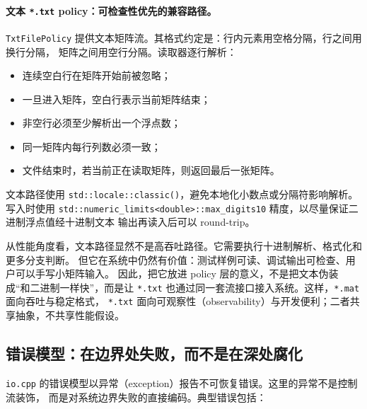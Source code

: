 \paragraph{文本 \texttt{*.txt} policy：可检查性优先的兼容路径。}
\texttt{TxtFilePolicy} 提供文本矩阵流。其格式约定是：行内元素用空格分隔，行之间用换行分隔，
矩阵之间用空行分隔。读取器逐行解析：

\begin{itemize}
    \item 连续空白行在矩阵开始前被忽略；
    \item 一旦进入矩阵，空白行表示当前矩阵结束；
    \item 非空行必须至少解析出一个浮点数；
    \item 同一矩阵内每行列数必须一致；
    \item 文件结束时，若当前正在读取矩阵，则返回最后一张矩阵。
\end{itemize}

文本路径使用 \texttt{std::locale::classic()}，避免本地化小数点或分隔符影响解析。
写入时使用 \texttt{std::numeric\_limits<double>::max\_digits10} 精度，以尽量保证二进制浮点值经十进制文本
输出再读入后可以 round-trip。

从性能角度看，文本路径显然不是高吞吐路径。它需要执行十进制解析、格式化和更多分支判断。
但它在系统中仍然有价值：测试样例可读、调试输出可检查、用户可以手写小矩阵输入。
因此，把它放进 policy 层的意义，不是把文本伪装成“和二进制一样快”，而是让
\texttt{*.txt} 也通过同一套流接口接入系统。这样，\texttt{*.mat} 面向吞吐与稳定格式，
\texttt{*.txt} 面向可观察性（observability）与开发便利；二者共享抽象，不共享性能假设。

\subsection{错误模型：在边界处失败，而不是在深处腐化}

\texttt{io.cpp} 的错误模型以异常（exception）报告不可恢复错误。这里的异常不是控制流装饰，
而是对系统边界失败的直接编码。典型错误包括：

